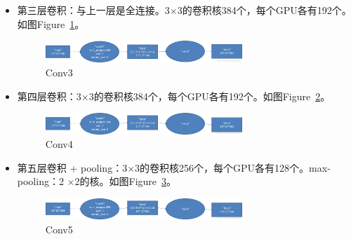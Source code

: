 \documentclass[12pt]{article}
\begin{document}
\begin{itemize}
\item 第三层卷积：与上一层是全连接。3$\times$3的卷积核384个，每个GPU各有192个。如图Figure~\ref{fig:conv3}。
	\begin{figure}[!ht]
	\centering
	\includegraphics[width=0.7\textwidth]{conv3}
	\caption{Conv3}
	\label{fig:conv3}
	\end{figure}
\item 第四层卷积：3$\times$3的卷积核384个，每个GPU各有192个。如图Figure~\ref{fig:conv4}。
	\begin{figure}[!ht]
	\centering
	\includegraphics[width=0.7\textwidth]{conv4}
	\caption{Conv4}
	\label{fig:conv4}
	\end{figure}
\item 第五层卷积 + pooling：3$\times$3的卷积核256个，每个GPU各有128个。max-pooling：2 $\times$2的核。如图Figure~\ref{fig:conv5}。
	\begin{figure}[!ht]
	\centering
	\includegraphics[width=0.7\textwidth]{conv4}
	\caption{Conv5}
	\label{fig:conv5}
	\end{figure}
\end{itemize}
\end{document}
